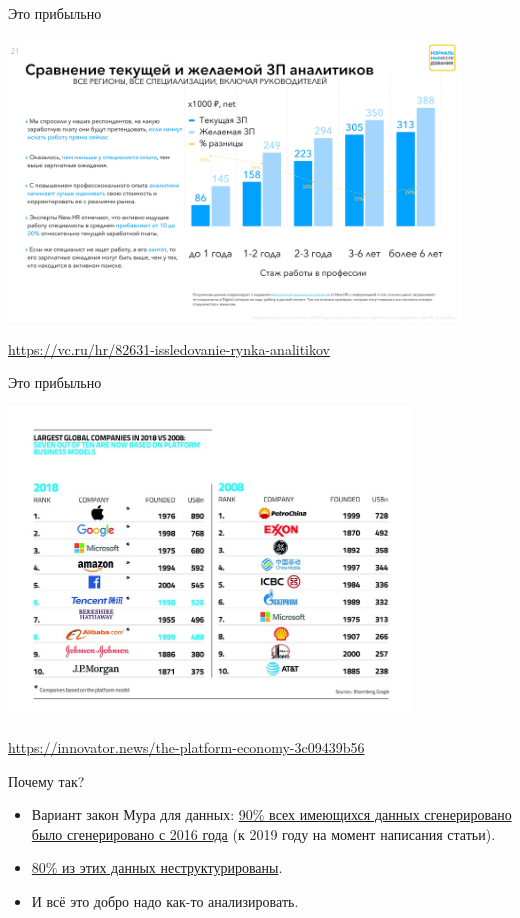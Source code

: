 \documentclass[9pt]{beamer}
\begin{document}
\begin{frame}{Это прибыльно}
\begin{center}
    \includegraphics[width=0.9\textwidth]{img/intro_data_scientist_wage.png}
\end{center}
\url{https://vc.ru/hr/82631-issledovanie-rynka-analitikov}
\end{frame}

\begin{frame}{Это прибыльно}
\begin{center}
    \includegraphics[width=0.8\textwidth]{img/intro_it_companies.jpeg}
\end{center}
\url{https://innovator.news/the-platform-economy-3c09439b56}
\end{frame}

\begin{frame}{Почему так?}
    \begin{itemize}
        \item Вариант закон Мура для данных: \href{https://medium.com/alectio/why-the-end-of-moores-law-means-the-end-of-big-data-as-we-know-it-7e77477c70a0}{90\% всех имеющихся данных сгенерировано было сгенерировано с 2016 года} (к 2019 году на момент написания статьи).
        \item \href{https://solutionsreview.com/data-management/80-percent-of-your-data-will-be-unstructured-in-five-years/}{80\% из этих данных неструктурированы}.
        \item И всё это добро надо как-то анализировать.
    \end{itemize}
\end{frame}
\end{document}
